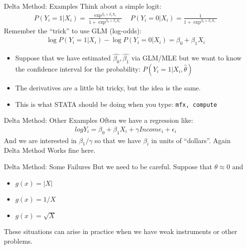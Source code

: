 \documentclass[11pt,handout,xcolor=pdftex,dvipsnames,table,mathserif,aspectratio=169]{beamer}
\begin{document}
\begin{frame}{Delta Method: Examples}
Think about a simple logit:
\begin{eqnarray*}
P(Y_i=1 | X_i ) = \frac{\exp^{\beta_0 + \beta_1 X_i}}{1+\exp^{\beta_0 + \beta_1 X_i}}  \quad P(Y_i=0 | X_i ) = \frac{1}{1+\exp^{\beta_0 + \beta_1 X_i}} 
\end{eqnarray*}
Remember the ``trick'' to use GLM (log-odds):
\begin{eqnarray*}
\log P(Y_i=1 | X_i) - \log P(Y_i=0 | X_i) = \beta_0 + \beta_1 X_i
\end{eqnarray*}
\begin{itemize}
\item Suppose that we have estimated $\hat{\beta_0},\hat{\beta_1}$ via GLM/MLE but we want to know the confidence interval for the probability: $P(Y_i=1 | X_i,\hat{\theta})$
\item The derivatives are a little bit tricky, but the idea is the same.
\item This is what STATA should be doing when you type: \tt{mfx, compute}
\end{itemize}
\end{frame}

\begin{frame}{Delta Method: Other Examples}
Often we have a regression like:
\begin{eqnarray*}
log Y_i = \beta_0 + \beta_1 X_i + \gamma Income_i + \epsilon_i
\end{eqnarray*}
And we are interested in $\beta_1 / \gamma$ so that we have $\beta_i$ in units of ``dollars''. Again Delta Method Works fine here.\\
\end{frame}


\begin{frame}{Delta Method: Some Failures}
But we need to be careful.  Suppose that $\theta \approx 0$ and 
\begin{itemize}
\item $g(x)  = |X|$
\item $g(x)  = 1/X$
\item $g(x)  = \sqrt{X}$
\end{itemize}
These situations can arise in practice when we have weak instruments or other problems.
\end{frame}
\end{document}
